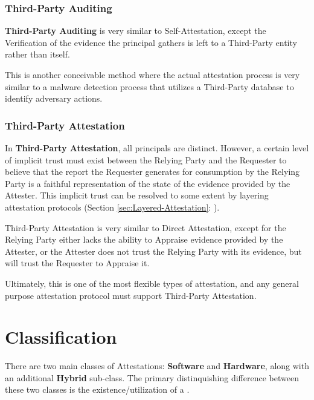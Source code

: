 \documentclass[acmsmall]{acmart}
\theoremstyle{definition}
\newcommand{\secref}[1]{Section \ref{#1}: \nameref{#1}}
\begin{document}
\subsubsection{Third-Party Auditing}
\textbf{Third-Party Auditing} is very similar to Self-Attestation, except the Verification of
the evidence the principal gathers is left to a Third-Party entity rather than itself.

This is another conceivable method where the actual attestation process is very similar to a
malware detection process that utilizes a Third-Party database to identify
adversary actions.

\subsubsection{Third-Party Attestation}
In \textbf{Third-Party Attestation}, all principals are distinct. However, a certain level of implicit trust
must exist between the Relying Party and the Requester to believe that the report the Requester generates for
consumption by the Relying Party is a faithful representation of the state of the evidence provided by the Attester.
This implicit trust can be resolved to some extent by layering attestation protocols (\secref{sec:Layered-Attestation}).

Third-Party Attestation is very similar to Direct Attestation, except for the Relying Party either lacks the ability
to Appraise evidence provided by the Attester, or the Attester does not trust the Relying Party with its evidence, but
will trust the Requester to Appraise it.

Ultimately, this is one of the most flexible types of attestation, and any general purpose attestation protocol must
support Third-Party Attestation.


\section{Classification}

There are two main classes of Attestations: \textbf{Software} and \textbf{Hardware}, along with an additional \textbf{Hybrid} sub-class.
The primary distinquishing difference between these two classes is
the existence/utilization of a .
\end{document}
